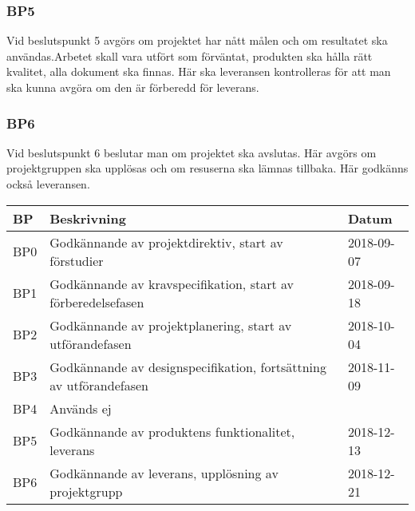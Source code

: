 \documentclass[projektplan/plan.tex]{subfiles}
\begin{document}
\subsubsection*{BP5}
Vid beslutspunkt 5 avgörs om projektet har nått målen och om resultatet ska
användas.Arbetet skall vara utfört som förväntat, produkten ska hålla rätt
kvalitet, alla dokument ska finnas. Här ska leveransen kontrolleras för att man
ska kunna avgöra om den är förberedd för leverans.

\subsubsection*{BP6}
Vid beslutspunkt 6 beslutar man om projektet ska avslutas. Här avgörs om
projektgruppen ska upplösas och om resuserna ska lämnas tillbaka. Här godkänns
också leveransen.

    \renewcommand{\arraystretch}{1.6}
    \begin{longtable}{p{8mm}p{75mm}p{25mm}}
        \bfseries BP &
        \bfseries Beskrivning &
        \bfseries Datum 
	\\\hline\endhead
    BP0 & Godkännande av projektdirektiv, start av förstudier & 2018-09-07 \\
    BP1 & Godkännande av kravspecifikation, start av förberedelsefasen &
    2018-09-18 \\
   BP2 & Godkännande av projektplanering, start av utförandefasen & 2018-10-04
    \\
    BP3 & Godkännande av designspecifikation, fortsättning av utförandefasen &
    2018-11-09\\
    BP4 & Används ej & \\
    BP5 & Godkännande av produktens funktionalitet, leverans & 2018-12-13 \\
    BP6 & Godkännande av leverans, upplösning av projektgrupp & 2018-12-21 \\

    \end{longtable}

\newpage
\end{document}
